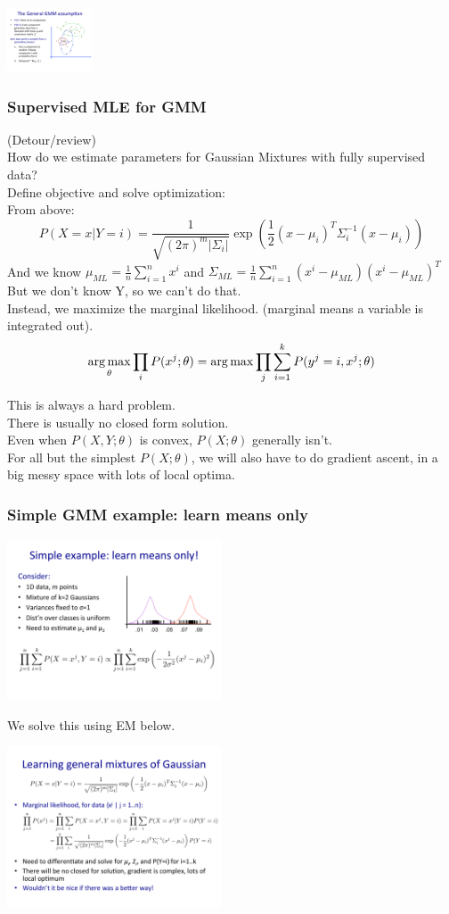 \includegraphics[width=1.0in]{figures/GMM_cartoon.pdf}

\subsubsection{Supervised MLE for GMM}
(Detour/review) \hfill \\

How do we estimate parameters for Gaussian Mixtures with fully supervised data? \hfill \\
Define objective and solve optimization: \hfill \\
From above: 
$$ P(X=x | Y=i) = \frac{1}{\sqrt{(2 \pi)^m | \Sigma_i |}} \exp \left(  \frac{1}{2}(x - \mu_i)^T \Sigma_i^{-1} (x- \mu_i) \right) $$
And we know $ \displaystyle \mu_{ML} = \frac{1}{n} \sum_{i=1}^n x^i$ and $ \displaystyle \Sigma_{ML} = \frac{1}{n} \sum_{i=1}^n (x^i - \mu_{ML}) (x^i - \mu_{ML})^T$ \hfill \\

But we don't know Y, so we can't do that.  \hfill \\

Instead, we maximize the marginal likelihood.  (marginal means a variable is integrated out).
$$ \operatorname*{arg\,max}_{\theta} \prod_i P(x^j; \theta) = \operatorname*{arg\,max} \prod_j \sum_{i=1}^k P(y^j=i, x^j; \theta) $$

This is always a hard problem.  \hfill \\
There is usually no closed form solution.  \hfill \\
Even when $P(X, Y; \theta)$ is convex, $P(X; \theta)$ generally isn't.  \hfill \\
For all but the simplest  $P(X; \theta)$, we will also have to do gradient ascent, in a big messy space with lots of local optima.   \hfill \\

\subsubsection{Simple GMM example: learn means only}
\includegraphics[width=2.5in]{figures/gmm_for_means_only.pdf}

We solve this using EM below. 

\includegraphics[width=2.5in]{figures/learning_general_mixtures_of_Gaussians.pdf}

